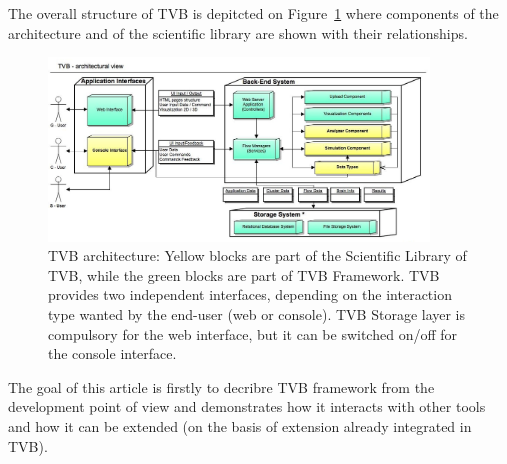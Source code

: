 
The overall structure of TVB is depitcted on Figure~\ref{fig:architecture} where
components of the architecture and of the scientific library are shown with
their relationships.

 \begin{figure}
        \centering
        \includegraphics[width=0.90\textwidth]{images/architecture.jpg}
        \caption{TVB architecture: Yellow blocks are part of the Scientific
            Library of TVB, while the green blocks are part of TVB Framework.
            TVB provides two independent interfaces, depending on the
            interaction type wanted by the end-user (web or console).  TVB
            Storage layer is compulsory for the web interface, but it can be
            switched on/off for the console interface.  
         }
        \label{fig:architecture}
 \end{figure}

 The goal of this article is firstly to decribre TVB framework from the
 development point of view and demonstrates how it interacts with other tools
 and how it can be extended (on the basis of extension already integrated in
 TVB).
